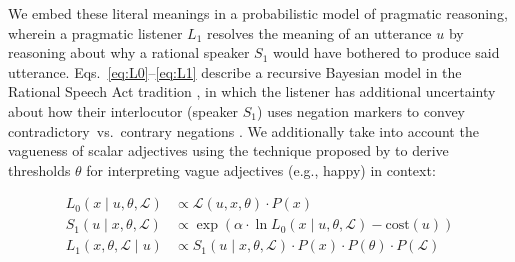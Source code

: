 \documentclass[floatsintext,doc]{apa6}
\begin{document}

We embed these literal meanings in a probabilistic model of pragmatic reasoning, wherein a pragmatic listener $L_1$ resolves the meaning of an utterance $u$ by reasoning about why a rational speaker $S_1$ would have bothered to produce said utterance.
Eqs.~\ref{eq:L0}--\ref{eq:L1} describe a recursive Bayesian model in the Rational Speech Act tradition \cite{Franke2015a, Goodman2016:RSA}, in which the listener  has additional uncertainty about how their interlocutor (speaker $S_1$) uses negation markers to convey contradictory~vs.~contrary negations \cite{Bergen2016}.
We additionally take into account the vagueness of scalar adjectives using the technique proposed by  to derive thresholds \(\theta\) for interpreting vague adjectives (e.g., happy) in context:


\vspace*{-0.5cm}

\begin{align}
L_{0}(x \mid u, \theta, \mathcal{L}) &\propto \mathcal{L}(u, x, \theta) \cdot P(x) \label{eq:L0} \\
S_{1}(u \mid x, \theta, \mathcal{L}) &\propto \exp{(\alpha \cdot \ln {L_{0}(x \mid u, \theta, \mathcal{L})} - \text{cost}(u))} \label{eq:S1}\\
L_{1}(x, \theta, \mathcal{L} \mid u) &\propto S_{1}(u \mid x, \theta, \mathcal{L}) \cdot P(x) \cdot  P(\theta) \cdot P(\mathcal{L}) \label{eq:L1}
\end{align}
\end{document}
